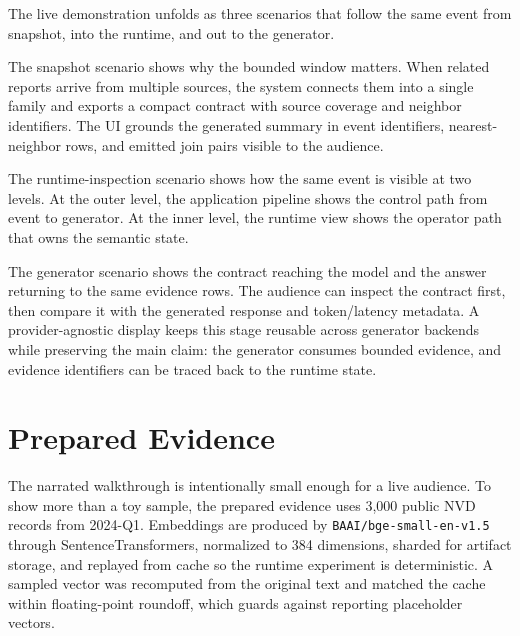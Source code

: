 \documentclass[sigconf,anonymous]{acmart}
\begin{document}
The live demonstration unfolds as three scenarios that follow the same event from snapshot, into the runtime, and out to the generator.

The snapshot scenario shows why the bounded window matters. When related reports arrive from multiple sources, the system connects them into a single family and exports a compact contract with source coverage and neighbor identifiers. The UI grounds the generated summary in event identifiers, nearest-neighbor rows, and emitted join pairs visible to the audience.

The runtime-inspection scenario shows how the same event is visible at two levels. At the outer level, the application pipeline shows the control path from event to generator. At the inner level, the runtime view shows the operator path that owns the semantic state.

The generator scenario shows the contract reaching the model and the answer returning to the same evidence rows. The audience can inspect the contract first, then compare it with the generated response and token/latency metadata. A provider-agnostic display keeps this stage reusable across generator backends while preserving the main claim: the generator consumes bounded evidence, and evidence identifiers can be traced back to the runtime state.

\section{Prepared Evidence}
\label{sec:evidence}

The narrated walkthrough is intentionally small enough for a live audience. To show more than a toy sample, the prepared evidence uses 3,000 public NVD records from 2024-Q1. Embeddings are produced by \texttt{BAAI/bge-small-en-v1.5} through SentenceTransformers, normalized to 384 dimensions, sharded for artifact storage, and replayed from cache so the runtime experiment is deterministic. A sampled vector was recomputed from the original text and matched the cache within floating-point roundoff, which guards against reporting placeholder vectors.

\begin{table}[t]
  \centering
  
  \caption{Prepared evidence from real runs. Top: clustered runtime replay on 3,000 NVD records with BGE embeddings, using the p=1 baseline and the p=2 operating point used in the live profile. Bottom: a 20-event contract-to-answer generator run reports answer coverage, fallback count, and LLM latency.}
  \label{tab:results}
\end{table}
\end{document}
